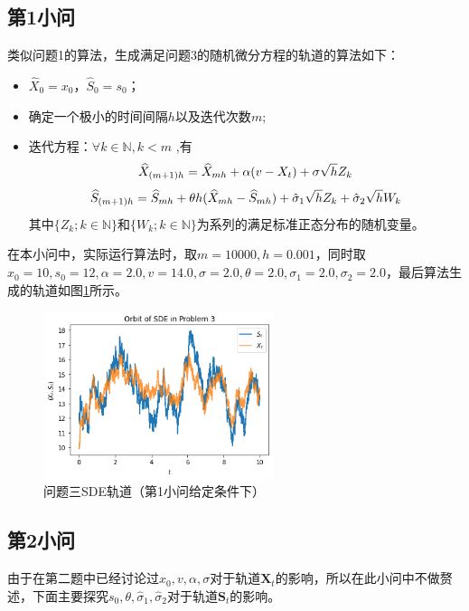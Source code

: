 \documentclass{article}
\begin{document}
\subsection{第1小问}

类似问题1的算法，生成满足问题3的随机微分方程的轨道的算法如下：

\begin{itemize}
\item $\widehat{X}_0 = x_0$，$\widehat{S}_0 = s_0$；
\item 确定一个极小的时间间隔$h$以及迭代次数$m$;
\item 迭代方程：$\forall k \in \mathbb{N},k < m$ ,有
$$
\widehat{X}_{(m+1)h} = \widehat{X}_{mh} + \alpha (v - X_t) + \sigma \sqrt{h}Z_k \\
$$
$$
\widehat{S}_{(m+1)h} = \widehat{S}_{mh} + \theta h(\widehat{X}_{mh} - \widehat{S}_{mh}) + \hat{\sigma}_1 \sqrt{h}Z_k + \hat{\sigma}_2 \sqrt{h}W_k\\
$$
其中$\{Z_k;k \in \mathbb{N}\}$和$\{W_k;k \in \mathbb{N}\}$为系列的满足标准正态分布的随机变量。
\end{itemize}

在本小问中，实际运行算法时，取$m = 10000, h = 0.001$，同时取$x_0 = 10, s_0 = 12,\alpha = 2.0, v = 14.0, \sigma = 2.0, \theta = 2.0, \sigma_1 =  2.0, \sigma_2 = 2.0$，最后算法生成的轨道如图\ref{fig:SDE2}所示。

\begin{figure}[H]
\centering
\includegraphics[width=0.6\textwidth]{figures/SDE2 Orbit1.png}
\caption{\label{fig:SDE2}问题三SDE轨道（第1小问给定条件下）}
\end{figure}

\subsection{第2小问}

由于在第二题中已经讨论过$x_0, v, \alpha, \sigma$对于轨道$\boldsymbol{X}_t$的影响，所以在此小问中不做赘述，下面主要探究$s_0, \theta, \hat{\sigma}_1, \hat{\sigma}_2$对于轨道$\boldsymbol{S}_t$的影响。
\end{document}
